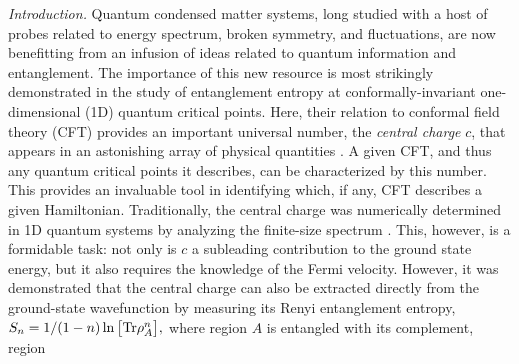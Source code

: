 \documentclass[prl,aps,twocolumn,floatfix,amsmath,amssymb,superscriptaddress,tightenlines]{revtex4}
\begin{document}
{\it Introduction.} Quantum condensed matter systems, long studied with a host of probes related to energy spectrum, broken symmetry,
and fluctuations, are now benefitting from an infusion of ideas related to quantum information and entanglement.
The importance of this new resource is most strikingly 
demonstrated in the study of entanglement entropy at conformally-invariant one-dimensional (1D) quantum critical points.
Here, their relation to conformal field theory (CFT) provides an important
universal number, the {\it central charge} $c$, that appears in an astonishing array of physical
quantities \cite{Cardyubiquitous}. A given CFT, and
thus any quantum critical points it describes, can be
characterized by this number.
This provides an invaluable tool in identifying which, if any, CFT describes a given Hamiltonian. 
Traditionally, the central charge was numerically determined in 1D quantum systems by analyzing the finite-size spectrum \cite{BCN,Affleck}.
This, however, is a formidable task: not only is $c$ a subleading contribution to the ground state energy, but it also requires the knowledge of the Fermi velocity.
%
%
However, it was demonstrated \cite{Holzhey, VidalC} that the central charge can also be extracted 
directly from the ground-state wavefunction by measuring its Renyi
entanglement entropy, $ S_n = 1/(1-n) \ln \big[ {\rm Tr} \rho_A^n
\big], $ where region $A$ is entangled with its complement, region
\end{document}
